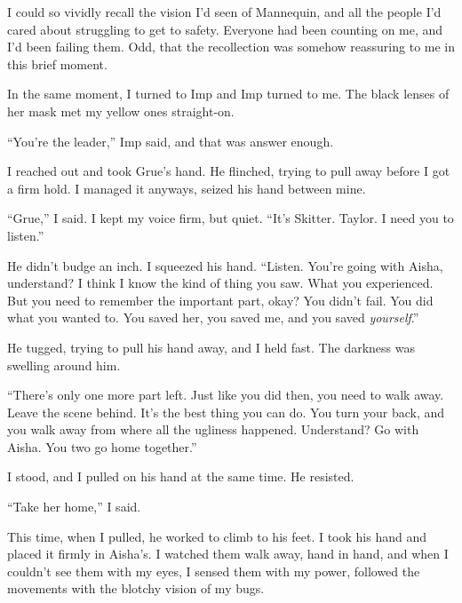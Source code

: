 I could so vividly recall the vision I'd seen of Mannequin, and all the people I'd cared about struggling to get to safety.  Everyone had been counting on me, and I'd been failing them.  Odd, that the recollection was somehow reassuring to me in this brief moment.



In the same moment, I turned to Imp and Imp turned to me.  The black lenses of her mask met my yellow ones straight-on.



``You're the leader,'' Imp said, and that was answer enough.



I reached out and took Grue's hand.  He flinched, trying to pull away before I got a firm hold.  I managed it anyways, seized his hand between mine.



``Grue,'' I said.  I kept my voice firm, but quiet.  ``It's Skitter.  Taylor.  I need you to listen.''



He didn't budge an inch.  I squeezed his hand.  ``Listen.  You're going with Aisha, understand?  I think I know the kind of thing you saw.  What you experienced.  But you need to remember the important part, okay?  You didn't fail.  You did what you wanted to.  You saved her, you saved me, and you saved \emph{yourself}.''



He tugged, trying to pull his hand away, and I held fast.  The darkness was swelling around him.



``There's only one more part left.  Just like you did then, you need to walk away.  Leave the scene behind.  It's the best thing you can do.  You turn your back, and you walk away from where all the ugliness happened.  Understand?  Go with Aisha.  You two go home together.''



I stood, and I pulled on his hand at the same time.  He resisted.



``Take her home,'' I said.



This time, when I pulled, he worked to climb to his feet.  I took his hand and placed it firmly in Aisha's.  I watched them walk away, hand in hand, and when I couldn't see them with my eyes, I sensed them with my power, followed the movements with the blotchy vision of my bugs.



